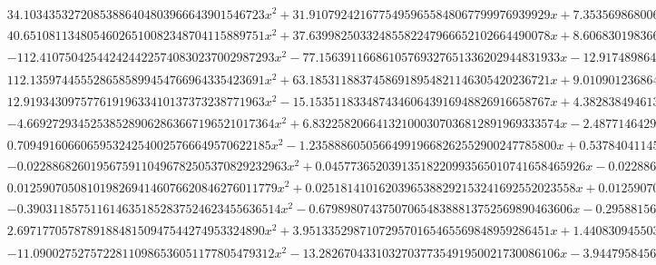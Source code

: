 \documentclass{article}
\begin{document}
\begin{landscape}
\begin{eqnarray*}
\begin{array}{cc}
\begin{array}{cc}
 34.10343532720853886404803966643901546723 x^2+31.91079242167754959655848067799976939929 x+7.353569868006539161130531808674417031027 & x\geq -\frac{1}{2}\land x<-\frac{7}{16} \\
 40.65108113480546026510082348704115889751 x^2+37.63998250332485582247966652102664490078 x+8.606830198366887398050791211836546046978 & x\geq -\frac{7}{16}\land x<-\frac{3}{8} \\
 -112.4107504254424244225740830237002987293 x^2-77.15639116686105769327651336202944831933 x-12.91748986479297138615349251623647143179 & x\geq -\frac{3}{8}\land x<-\frac{5}{16} \\
 112.1359744555286585899454766964335423691 x^2+63.18531188374586918954821146305420236721 x+9.010901236864360939287870737682848987979 & x\geq -\frac{5}{16}\land x<-\frac{1}{4} \\
 12.91934309757761919633410137373238771963 x^2-15.15351183348743460643916948826916658767 x+4.382838494613335423084196095702918425369 & x\geq \frac{1}{2}\land x<\frac{5}{8} \\
 -4.669272934525385289062863667196521017364 x^2+6.832258206641321000307036812891969333574 x-2.487714642926900704023993373409936550019 & x\geq \frac{5}{8}\land x<\frac{3}{4} \\
 0.7094916066065953242540025766649570622185 x^2-1.235888605056649919668262552900247785800 x+0.5378404114598383909667438887621448697463 & x\geq \frac{3}{4}\land x<\frac{7}{8} \\
 -0.02288682601956759110496782505370829232963 x^2+0.04577365203913518220993565010741658465926 x-0.02288682601956759110496782505370829232963 & x\geq \frac{7}{8}\land x<1 \\
 0.01259070508101982694146076620846276011779 x^2+0.02518141016203965388292153241692552023558 x+0.01259070508101982694146076620846276011779 & x\geq -1\land x<-\frac{7}{8} \\
 -0.3903118575116146351852837524623455636514 x^2-0.6798980743750706548388813752569890463606 x-0.2958815694039659331243280058988748627680 & x\geq -\frac{7}{8}\land x<-\frac{3}{4} \\
 2.697177057878918848150947544274953324890 x^2+3.951335298710729570165465569848959286451 x+1.440830945503209151252302098515855762036 & x\geq -\frac{3}{4}\land x<-\frac{5}{8} \\
 -11.09002752757228110986536051177805479312 x^2-13.28267043310327037735491950021730086106 x-3.944795845688665832347818235879850534060 & x\geq -\frac{5}{8}\land x<-\frac{1}{2}
\end{array}

\end{array}\end{eqnarray*}
\end{landscape}
\end{document}
